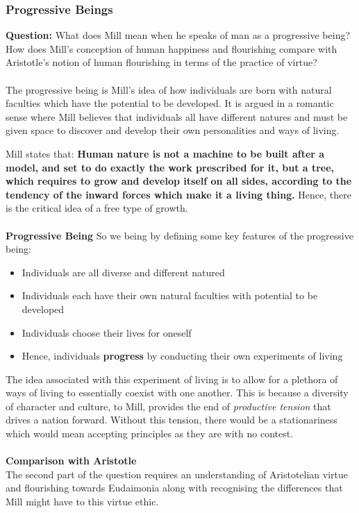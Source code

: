 \documentclass[12pt, letterpaper]{article}
\begin{document}
\subsubsection{Progressive Beings}
\textbf{Question:} What does Mill mean when he speaks of man as a progressive being? How does Mill's conception of human happiness and flourishing compare with Aristotle's notion of human flourishing in terms of the practice of virtue?\\\\
The progressive being is Mill's idea of how individuals are born with natural faculties which have the potential to be developed. It is argued in a romantic sense where Mill believes that individuals all have different natures and must be given space to discover and develop their own personalities and ways of living.

Mill states that: \textbf{Human nature is not a machine to be built after a model, and set to do exactly the work prescribed for it, but a tree, which requires to grow and develop itself on all sides, according to the tendency of the inward forces which make it a living thing.} Hence, there is the critical idea of a free type of growth.\\\\
\textbf{Progressive Being}
So we being by defining some key features of the progressive being:
\begin{itemize}
	\item Individuals are all diverse and different natured
	\item Individuals each have their own natural faculties with potential to be developed
	\item Individuals choose their lives for oneself
	\item Hence, individuals \textbf{progress} by conducting their own experiments of living
\end{itemize}
The idea associated with this experiment of living is to allow for a plethora of ways of living to essentially coexist with one another. This is because a diversity of character and culture, to Mill, provides the end of \textit{productive tension} that drives a nation forward. Without this tension, there would be a stationariness which would mean accepting principles as they are with no contest.
\\\\
\textbf{Comparison with Aristotle}\\
The second part of the question requires an understanding of Aristotelian virtue and flourishing towards Eudaimonia along with recognising the differences that Mill might have to this virtue ethic.
\end{document}
